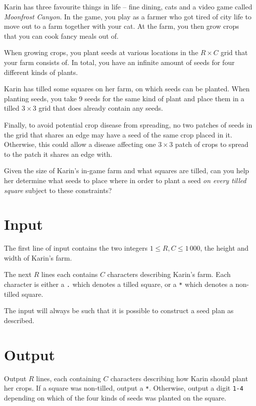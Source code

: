 Karin has three favourite things in life -- fine dining, cats and a video game called \emph{Moonfrost Canyon}.
In the game, you play as a farmer who got tired of city life to move out to a farm together with your cat.
At the farm, you then grow crops that you can cook fancy meals out of.

When growing crops, you plant seeds at various locations in the $R \times C$ grid that your farm consists of.
In total, you have an infinite amount of seeds for four different kinds of plants. 

Karin has tilled some squares on her farm, on which seeds can be planted.
When planting seeds, you take 9 seeds for the same kind of plant and place them in a tilled $3 \times 3$ grid that does already contain any seeds.

Finally, to avoid potential crop disease from spreading, no two patches of seeds in the grid that shares an edge may have a seed of the same crop placed in it.
Otherwise, this could allow a disease affecting one $3 \times 3$ patch of crops to spread to the patch it shares an edge with.

Given the size of Karin's in-game farm and what squares are tilled, can you help her determine what seeds to place where in order to plant a seed \emph{on every tilled square} subject to these constraints?

\section*{Input}
The first line of input contains the two integers $1 \le R, C \le 1\,000$, the height and width of Karin's farm.

The next $R$ lines each contains $C$ characters describing Karin's farm.
Each character is either a \texttt{.} which denotes a tilled square, or a \texttt{*} which denotes a non-tilled square.

The input will always be such that it is possible to construct a seed plan as described.

\section*{Output}
Output $R$ lines, each containing $C$ characters describing how Karin should plant her crops.
If a square was non-tilled, output a \texttt{*}.
Otherwise, output a digit \texttt{1-4} depending on which of the four kinds of seeds was planted on the square.

